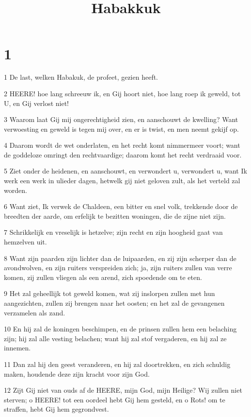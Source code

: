 

\title{Habakkuk}



\chapter{1}

\par 1 De last, welken Habakuk, de profeet, gezien heeft.
\par 2 HEERE! hoe lang schreeuw ik, en Gij hoort niet, hoe lang roep ik geweld, tot U, en Gij verlost niet!
\par 3 Waarom laat Gij mij ongerechtigheid zien, en aanschouwt de kwelling? Want verwoesting en geweld is tegen mij over, en er is twist, en men neemt gekijf op.
\par 4 Daarom wordt de wet onderlaten, en het recht komt nimmermeer voort; want de goddeloze omringt den rechtvaardige; daarom komt het recht verdraaid voor.
\par 5 Ziet onder de heidenen, en aanschouwt, en verwondert u, verwondert u, want Ik werk een werk in ulieder dagen, hetwelk gij niet geloven zult, als het verteld zal worden.
\par 6 Want ziet, Ik verwek de Chaldeen, een bitter en snel volk, trekkende door de breedten der aarde, om erfelijk te bezitten woningen, die de zijne niet zijn.
\par 7 Schrikkelijk en vreselijk is hetzelve; zijn recht en zijn hoogheid gaat van hemzelven uit.
\par 8 Want zijn paarden zijn lichter dan de luipaarden, en zij zijn scherper dan de avondwolven, en zijn ruiters verspreiden zich; ja, zijn ruiters zullen van verre komen, zij zullen vliegen als een arend, zich spoedende om te eten.
\par 9 Het zal geheellijk tot geweld komen, wat zij inslorpen zullen met hun aangezichten, zullen zij brengen naar het oosten; en het zal de gevangenen verzamelen als zand.
\par 10 En hij zal de koningen beschimpen, en de prinsen zullen hem een belaching zijn; hij zal alle vesting belachen; want hij zal stof vergaderen, en hij zal ze innemen.
\par 11 Dan zal hij den geest veranderen, en hij zal doortrekken, en zich schuldig maken, houdende deze zijn kracht voor zijn God.
\par 12 Zijt Gij niet van ouds af de HEERE, mijn God, mijn Heilige? Wij zullen niet sterven; o HEERE! tot een oordeel hebt Gij hem gesteld, en o Rots! om te straffen, hebt Gij hem gegrondvest.
